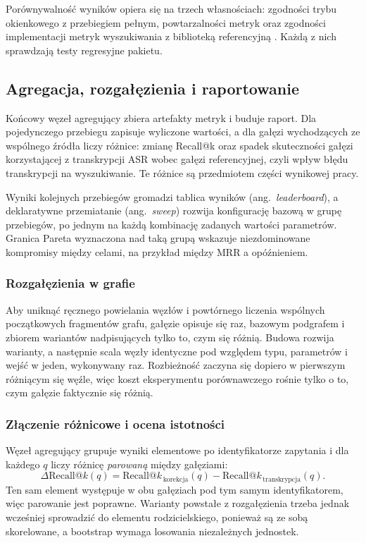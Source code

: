 Porównywalność wyników opiera się na trzech własnościach: zgodności trybu okienkowego z przebiegiem
pełnym, powtarzalności metryk oraz zgodności implementacji metryk wyszukiwania z biblioteką
referencyjną \cite{vangysel2018pytrec}. Każdą z nich sprawdzają testy regresyjne pakietu.

\subsection{Agregacja, rozgałęzienia i raportowanie}
Końcowy węzeł agregujący zbiera artefakty metryk i buduje raport. Dla pojedynczego przebiegu
zapisuje wyliczone wartości, a dla gałęzi wychodzących ze wspólnego źródła liczy różnice: zmianę
Recall@k oraz spadek skuteczności gałęzi korzystającej z transkrypcji ASR wobec gałęzi
referencyjnej, czyli wpływ błędu transkrypcji na wyszukiwanie. Te różnice są przedmiotem części
wynikowej pracy.

Wyniki kolejnych przebiegów gromadzi tablica wyników (ang.\ \textit{leaderboard}), a deklaratywne
przemiatanie (ang.\ \textit{sweep}) rozwija konfigurację bazową w grupę przebiegów, po jednym na
każdą kombinację zadanych wartości parametrów. Granica Pareta wyznaczona nad taką grupą wskazuje
niezdominowane kompromisy między celami, na przykład między MRR a opóźnieniem.

\subsubsection{Rozgałęzienia w grafie}
Aby uniknąć ręcznego powielania węzłów i powtórnego liczenia wspólnych początkowych fragmentów
grafu, gałęzie opisuje się raz, bazowym podgrafem i zbiorem wariantów nadpisujących tylko to, czym
się różnią. Budowa rozwija warianty, a następnie scala węzły identyczne pod względem typu,
parametrów i wejść w jeden, wykonywany raz. Rozbieżność zaczyna się dopiero w pierwszym różniącym
się węźle, więc koszt eksperymentu porównawczego rośnie tylko o to, czym gałęzie faktycznie się
różnią.

\subsubsection{Złączenie różnicowe i ocena istotności}
Węzeł agregujący grupuje wyniki elementowe po identyfikatorze zapytania i dla każdego $q$ liczy
różnicę \textit{parowaną} między gałęziami:
\[
\Delta\text{Recall@}k(q) =
\text{Recall@}k_{\,\text{korekcja}}(q) - \text{Recall@}k_{\,\text{transkrypcja}}(q).
\]
Ten sam element występuje w obu gałęziach pod tym samym identyfikatorem, więc parowanie jest
poprawne. Warianty powstałe z rozgałęzienia trzeba jednak wcześniej sprowadzić do elementu
rodzicielskiego, ponieważ są ze sobą skorelowane, a bootstrap wymaga losowania niezależnych
jednostek.

